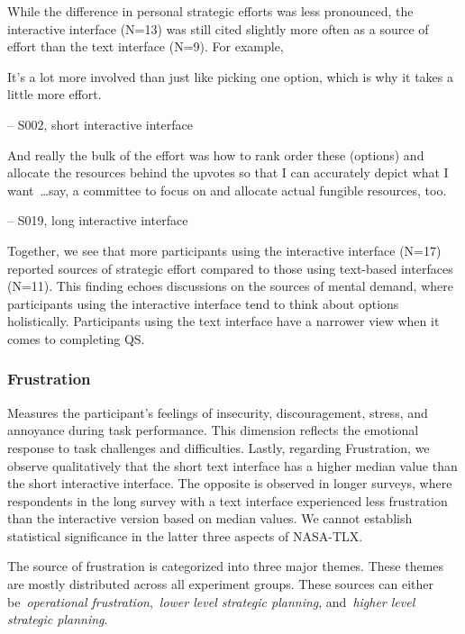 While the difference in personal strategic efforts was less pronounced, the interactive interface (N=13) was still cited slightly more often as a source of effort than the text interface (N=9). For example,

\begin{displayquote}
It's a lot more involved than just like picking one option, which is why it takes a little more effort.

\noindent \hfill -- S002, short interactive interface
\end{displayquote}
    
\begin{displayquote}
And really the bulk of the effort was how to rank order these (options) and allocate the resources behind the upvotes so that I can accurately depict what I want~\ldots say, a committee to focus on and allocate actual fungible resources, too. 

\noindent \hfill -- S019, long interactive interface
\end{displayquote}

Together, we see that more participants using the interactive interface (N=17) reported sources of strategic effort compared to those using text-based interfaces (N=11). This finding echoes discussions on the sources of mental demand, where participants using the interactive interface tend to think about options holistically. Participants using the text interface have a narrower view when it comes to completing QS.


\subsubsection{Frustration}
Measures the participant's feelings of insecurity, discouragement, stress, and annoyance during task performance. This dimension reflects the emotional response to task challenges and difficulties.
Lastly, regarding Frustration, we observe qualitatively that the short text interface has a higher median value than the short interactive interface. The opposite is observed in longer surveys, where respondents in the long survey with a text interface experienced less frustration than the interactive version based on median values. We cannot establish statistical significance in the latter three aspects of NASA-TLX.

The source of frustration is categorized into three major themes. These themes are mostly distributed across all experiment groups. These sources can either be~\textit{operational frustration},~\textit{lower level strategic planning}, and~\textit{higher level strategic planning}.

